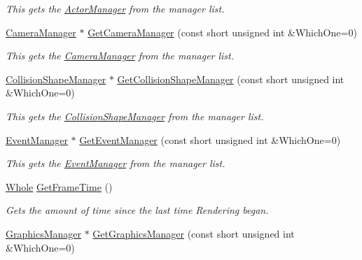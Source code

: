 \begin{DoxyCompactItemize}
\begin{DoxyCompactList}\small\item\em This gets the \hyperlink{classphys_1_1ActorManager}{ActorManager} from the manager list. \item\end{DoxyCompactList}\item 
\hyperlink{classphys_1_1CameraManager}{CameraManager} $\ast$ \hyperlink{classphys_1_1World_a33ab68866da54b7f8f766d5d29171fb7}{GetCameraManager} (const short unsigned int \&WhichOne=0)
\begin{DoxyCompactList}\small\item\em This gets the \hyperlink{classphys_1_1CameraManager}{CameraManager} from the manager list. \item\end{DoxyCompactList}\item 
\hyperlink{classphys_1_1CollisionShapeManager}{CollisionShapeManager} $\ast$ \hyperlink{classphys_1_1World_a283f2f821a6f647c87838a7799b682fb}{GetCollisionShapeManager} (const short unsigned int \&WhichOne=0)
\begin{DoxyCompactList}\small\item\em This gets the \hyperlink{classphys_1_1CollisionShapeManager}{CollisionShapeManager} from the manager list. \item\end{DoxyCompactList}\item 
\hyperlink{classphys_1_1EventManager}{EventManager} $\ast$ \hyperlink{classphys_1_1World_ac20a304413b4d47f9ae657983e903a67}{GetEventManager} (const short unsigned int \&WhichOne=0)
\begin{DoxyCompactList}\small\item\em This gets the \hyperlink{classphys_1_1EventManager}{EventManager} from the manager list. \item\end{DoxyCompactList}\item 
\hyperlink{namespacephys_a460f6bc24c8dd347b05e0366ae34f34a}{Whole} \hyperlink{classphys_1_1World_a348cebf8f15202a9916ac1b2400c63b1}{GetFrameTime} ()
\begin{DoxyCompactList}\small\item\em Gets the amount of time since the last time Rendering began. \item\end{DoxyCompactList}\item 
\hyperlink{classphys_1_1GraphicsManager}{GraphicsManager} $\ast$ \hyperlink{classphys_1_1World_a15f968adb5d841da6c5eb51607a8f525}{GetGraphicsManager} (const short unsigned int \&WhichOne=0)

\end{DoxyCompactItemize}
